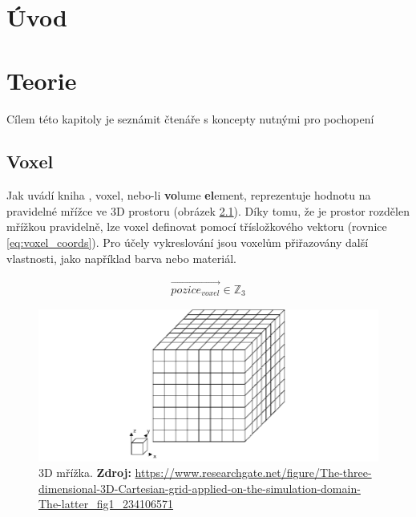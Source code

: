

\chapter{Úvod}
\label{uvod}

\chapter{Teorie}
\label{teorie}
Cílem této kapitoly je seznámit čtenáře s koncepty nutnými pro pochopení 

\section{Voxel}
Jak uvádí kniha \cite{gfx_principles_practice}, voxel, nebo-li \textbf{vo}lume \textbf{el}ement, reprezentuje hodnotu na pravidelné mřížce ve 3D prostoru (obrázek \ref{fig:3d_grid}). Díky tomu, že je prostor rozdělen mřížkou pravidelně, lze voxel definovat pomocí třísložkového vektoru (rovnice \ref{eq:voxel_coords}). Pro účely vykreslování jsou voxelům přiřazovány další vlastnosti, jako například barva nebo materiál.

\begin{equation} \label{eq:voxel_coords}
\begin{gathered}
\vec{pozice_{voxel}} \in \mathbb{Z}_3
\end{gathered}
\end{equation}

\begin{figure}[H]
    \centering
    \includegraphics[scale=0.5]{obrazky-figures/3d_grid.png}
    \caption{3D mřížka. \textbf{Zdroj: }\url{https://www.researchgate.net/figure/The-three-dimensional-3D-Cartesian-grid-applied-on-the-simulation-domain-The-latter_fig1_234106571}}
    \label{fig:3d_grid}
\end{figure}

